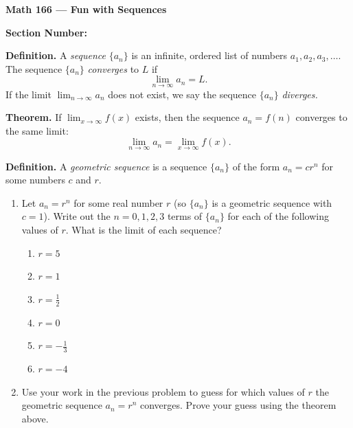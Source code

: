 \documentclass[12pt]{article}
\begin{document}
\begin{center}
    \Large \textbf{Math 166 --- Fun with Sequences}
\end{center}

\vspace{0.5cm}

\noindent \textbf{Section Number:} \underline{\hspace{3cm}}

\vspace{0.5cm}

\noindent \textbf{Definition.} A \emph{sequence} $\{a_n\}$ is an infinite, ordered list of numbers $a_1, a_2, a_3, \ldots$.
The sequence $\{a_n\}$ \emph{converges} to $L$ if 
\[
\lim_{n \to \infty} a_n = L.
\]
If the limit $\lim_{n \to \infty} a_n$ does not exist, we say the sequence $\{a_n\}$ \emph{diverges.}

\vspace{0.5cm}

\noindent \textbf{Theorem.} If $\displaystyle \lim_{x \to \infty} f(x)$ exists, then the sequence $a_n = f(n)$ converges to the same limit:
\[
\lim_{n \to \infty} a_n = \lim_{x \to \infty} f(x).
\]

\vspace{0.5cm}

\noindent \textbf{Definition.} A \emph{geometric sequence} is a sequence $\{a_n\}$ of the form $a_n = c r^n$ for some numbers $c$ and $r$.

\begin{enumerate}
    \item Let $a_n = r^n$ for some real number $r$ (so $\{a_n\}$ is a geometric sequence with $c=1$). 
    Write out the $n = 0,1,2,3$ terms of $\{a_n\}$ for each of the following values of $r$. 
    What is the limit of each sequence?
    \begin{enumerate}[label=(\alph*)]
        \item $r = 5$
        \item $r = 1$
        \item $r = \tfrac{1}{2}$
        \item $r = 0$
        \item $r = -\tfrac{1}{3}$
        \item $r = -4$
    \end{enumerate}

    \item Use your work in the previous problem to guess for which values of $r$ the geometric sequence $a_n = r^n$ converges. 
    Prove your guess using the theorem above.
\end{enumerate}
\end{document}
